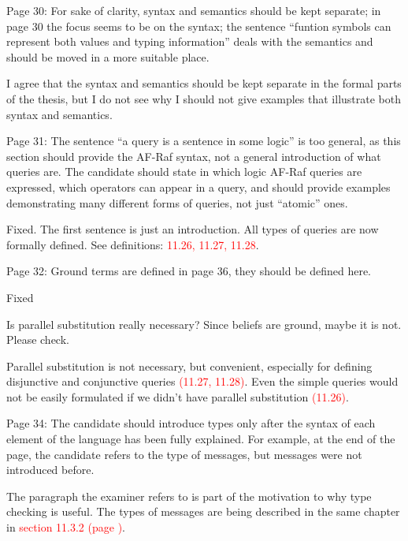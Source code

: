 \documentclass{article}
\newcommand*\R[1]{\textcolor{red}{#1}} %
\newenvironment{them}{\noindent\begingroup\color{blue}}{\endgroup\par}
\begin{document}
\begin{them}

Page 30:
For sake of clarity, syntax and semantics should be kept separate; in page 30
the focus seems to be on the syntax; the sentence “funtion symbols can
represent both values and typing information” deals with the semantics and
should be moved in a more suitable place.

\end{them}
I agree that the syntax and semantics should be kept separate in the formal
parts of the thesis, but I do not see why I should not give examples that
illustrate both syntax and semantics.

\begin{them}

Page 31:
The sentence “a query is a sentence in some logic” is too general, as this
section should provide the AF-Raf syntax, not a general introduction of what
queries are. The candidate should state in which logic AF-Raf queries are
expressed, which operators can appear in a query, and should provide examples
demonstrating many different forms of queries, not just “atomic” ones.

\end{them}
Fixed. The first sentence is just an introduction. All types of queries are now
formally defined. See definitions: \R{11.26, 11.27, 11.28}.

\begin{them}

Page 32:
Ground terms are defined in page 36, they should be defined here.
\end{them}
Fixed

\begin{them}

Is parallel substitution really necessary? Since beliefs are ground, maybe it
is not. Please check.

\end{them}
Parallel substitution is not necessary, but convenient, especially for defining
disjunctive and conjunctive queries \R{(11.27, 11.28)}. Even the simple queries
would not be easily formulated if we didn't have parallel substitution \R{(11.26)}.

\begin{them}

Page 34:
The candidate should introduce types only after the syntax of each element of
the language has been fully explained. For example, at the end of the page, the
candidate refers to the type of messages, but messages were not introduced
before.

\end{them}
The paragraph the examiner refers to is part of the motivation to why type
checking is useful. The types of messages are being described in the same
chapter in \R{section 11.3.2 (page )}.
\end{document}
